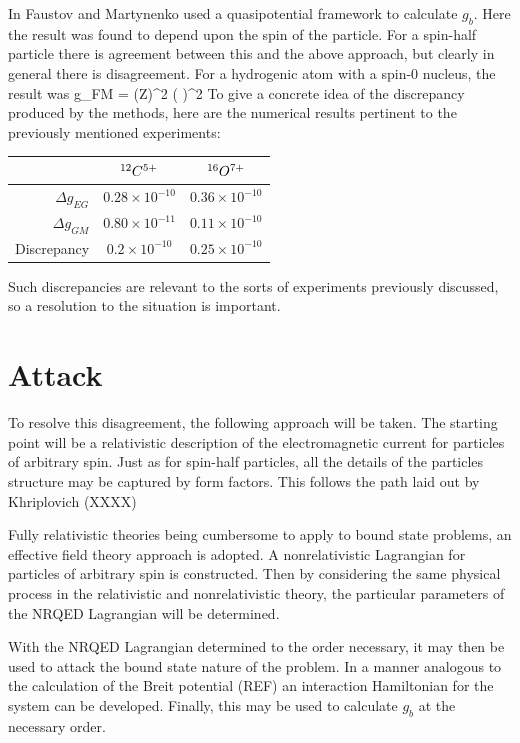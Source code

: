 In \cite{doi:10.1139/p02-112} Faustov and Martynenko used a quasipotential framework to calculate $g_b$.  Here the result was found to depend upon the spin of the particle.  For a spin-half particle there is agreement between this and the above approach, but clearly in general there is disagreement.   For a hydrogenic atom with a spin-0 nucleus, the result was
\beq
	\Delta g_{FM} =  (Z\alpha)^2 \left(  \right )^2
\eeq
To give a concrete idea of the discrepancy produced by the methods, here are the numerical results pertinent to the previously mentioned experiments:  
\begin{center}
\begin{tabular}{r c c}
 					&	$^{12}C^{5+}$						&	 $^{16}O^{7+}$	\\	\hline
 $\Delta g_{EG}$		&	$ 0.28 \times 10^{-10}$ 	&	$ 0.36 \times 10^{-10}$	\\
 $\Delta g_{GM}$		&	$ 0.80 \times 10^{-11}$		&	$ 0.11 \times 10^{-10}$	\\
 Discrepancy			&	$ 0.2 \times 10^{-10}$		&	$ 0.25\times 10^{-10}$	\\
\end{tabular}
\end{center}

Such discrepancies are relevant to the sorts of experiments previously discussed, so a resolution to the situation is important.

\section{Attack}

To resolve this disagreement, the following approach will be taken.  The starting point will be a relativistic description of the electromagnetic current for particles of arbitrary spin.  Just as for spin-half particles, all the details of the particles structure may be captured by form factors.  This follows the path laid out by Khriplovich (XXXX)

Fully relativistic theories being cumbersome to apply to bound state problems, an effective field theory approach is adopted.  A nonrelativistic Lagrangian for particles of arbitrary spin is constructed.  Then by considering the same physical process in the relativistic and nonrelativistic theory, the particular parameters of the NRQED Lagrangian will be determined.

With the NRQED Lagrangian determined to the order necessary, it may then be used to attack the bound state nature of the problem.  In a manner analogous to the calculation of the Breit potential (REF) an interaction Hamiltonian for the system can be developed.  Finally, this may be used to calculate $g_b$ at the necessary order.





